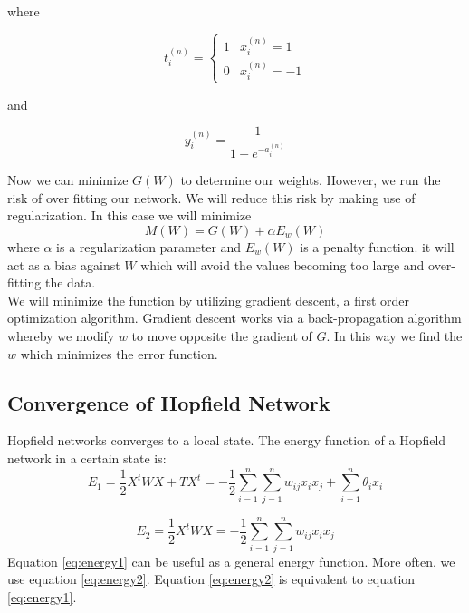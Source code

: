 where

\begin{equation}
\label{eq:opt2}
t_{i}^{(n)} = \begin{cases}
          1 & x_{i}^{(n)} = 1\\
          0 & x_{i}^{(n)} = -1
        \end{cases}
\end{equation}

and

\begin{equation}
\label{eq:opt3}
y_{i}^{(n)} = \frac{1}{1 + e^{-a_{i}^{(n)}}}
\end{equation}

Now we can minimize $G(W)$ to determine our weights. However, we run the risk of over fitting our network. We will reduce this risk by making use of regularization. In this case we will minimize 
\begin{equation}
\label{eq:opt4}
M(W) = G(W) + \alpha E_w(W)
\end{equation}
where $\alpha$ is a regularization parameter and $E_w(W)$ is a penalty function. it will act as a bias against $W$ which will avoid the values becoming too large and over-fitting the data.\\

We will minimize the function by utilizing gradient descent, a first order optimization algorithm. Gradient descent works via a back-propagation algorithm whereby we modify $w$ to move opposite the gradient of $G$. In this way we find the $w$ which minimizes the error function.


\subsection{Convergence of Hopfield Network}
Hopfield networks converges to a local state. The energy function of a Hopfield network in a certain state is:
\begin{equation}
\label{eq:energy1}
E_1 = \frac{1}{2}X^tWX + TX^t = - \frac{1}{2}\sum_{i = 1}^{n}\sum_{j = 1}^{n}w_{ij} x_i x_j + \sum_{i = 1}^n \theta_i x_i
\end{equation}

\begin{equation}
\label{eq:energy2}
E_2 = \frac{1}{2}X^tWX = - \frac{1}{2}\sum_{i = 1}^{n}\sum_{j = 1}^{n}w_{ij} x_i x_j
\end{equation}
Equation \ref{eq:energy1} can be useful as a general energy function. More often, we use equation \ref{eq:energy2}. Equation \ref{eq:energy2} is equivalent to equation \ref{eq:energy1}.\\


